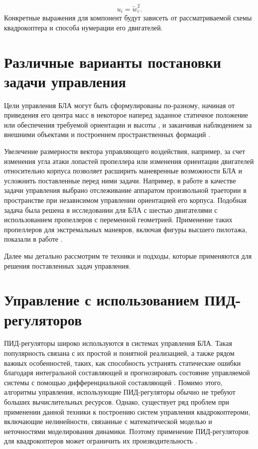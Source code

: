 \begin{equation} \label{eq:common_control_vector}
u_i = \tilde{w}_i^2.
\end{equation}
Конкретные выражения для компонент будут зависеть от рассматриваемой схемы квадрокоптера и способа нумерации его двигателей.
 
\section{Различные варианты постановки задачи управления}
Цели управления БЛА могут быть сформулированы по-разному,
начиная от приведения его центра масс в некоторое наперед заданное статичное положение
\cite{Huynh01, Yuskin01}
или обеспечения требуемой ориентации и высоты
\cite{Domingos01, Wang01, Gheorghita01, Lukmana01, Zabko01},
и заканчивая наблюдением за внешними объектами
\cite{Rodriguez01, Kendall01, Razinkova01}
и построением пространственных формаций
\cite{Ali01, Zhao01, Preiss01}.
 
Увелечение размерности вектора управляющего воздействия, например, за счет изменения угла атаки лопастей пропеллера \cite{Cutler01, Cutler02}  или изменения ориентации двигателей относительно корпуса \cite{Sridhar02, Kumar02} позволяет расширить маневренные возможности БЛА и усложнить поставленные перед ними задачи. Например, в работе \cite{Ryll02} в качестве задачи управления выбрано отслеживание аппаратом произвольной траетории в пространстве при независимом управлении ориентацией его корпуса. Подобная задача была решена в исследовании \cite{Kaufman01} для БЛА с шестью двигателями с использованием пропеллеров с переменной геометрией. Применение таких пропеллеров для экстремальных маневров, включая фигуры высшего пилотажа, показали в работе \cite{Cutler02}.
 
Далее мы детально рассмотрим те техники и подходы, которые применяются для решения поставленных задач управления. 

\section{Управление с использованием ПИД-регуляторов}

ПИД-регуляторы широко используются в системах управления БЛА.
Такая популярность связана с их простой и понятной реализацией, а также рядом важных особенностей, таких, как способность устранять статические ошибки благодаря интегральной составляющей и прогнозировать состояние управляемой системы с помощью дифференциальной составляющей  \cite{Astrom01}.
Помимо этого, алгоритмы управления, использующие ПИД-регуляторы обычно не требуют больших вычислительных ресурсов.
Однако, существует ряд проблем при применении данной техники к построению систем управления квадрокоптероми, включающие нелинейности, связанные с математической моделью и неточностями моделирования динамики.
Поэтому применение ПИД-регуляторов для квадрокоптеров может ограничить их производительность \cite{Zulu01}.

